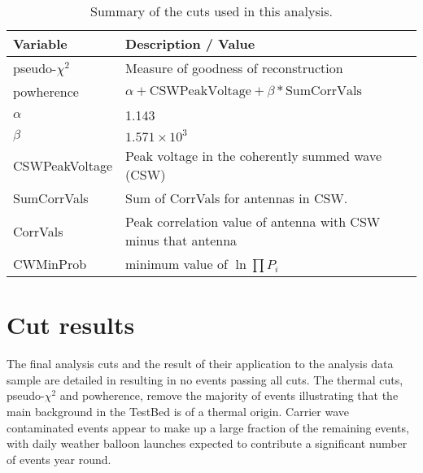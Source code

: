 \begin{table}
\begin{center}
  \begin{tabular}{ p{}  p{} }
    \textbf{Variable}  & \textbf{Description / Value}\\
    \hline
    pseudo-$\chi^{2}$ & Measure of goodness of reconstruction\\
    powherence & $\alpha +\mbox{CSWPeakVoltage} + \beta*\mbox{SumCorrVals}$\\
    $\alpha$ & 1.143\\
    $\beta$ & $1.571 \times 10^{3}$\\
    CSWPeakVoltage & Peak voltage in the coherently summed wave (CSW)\\
    SumCorrVals & Sum of CorrVals for antennas in CSW.\\
    CorrVals & Peak correlation value of antenna with CSW minus that antenna\\
    CWMinProb & minimum value of $\ln{\prod P_{i}}$\\
  \end{tabular}
  \caption{Summary of the cuts used in this analysis.}
  \label{tab:Analysis:Variables}
\end{center}
\end{table}



\section{Cut results}
\label{sec:Analysis:Cut-Results}

The final analysis cuts and the result of their application to the analysis data sample are detailed in  resulting in no events passing all cuts. The thermal cuts, pseudo-$\chi^{2}$ and powherence, remove the majority of events illustrating that the main background in the TestBed is of a thermal origin. Carrier wave contaminated events appear to make up a large fraction of the remaining events, with daily weather balloon launches expected to contribute a significant number of events year round. 

